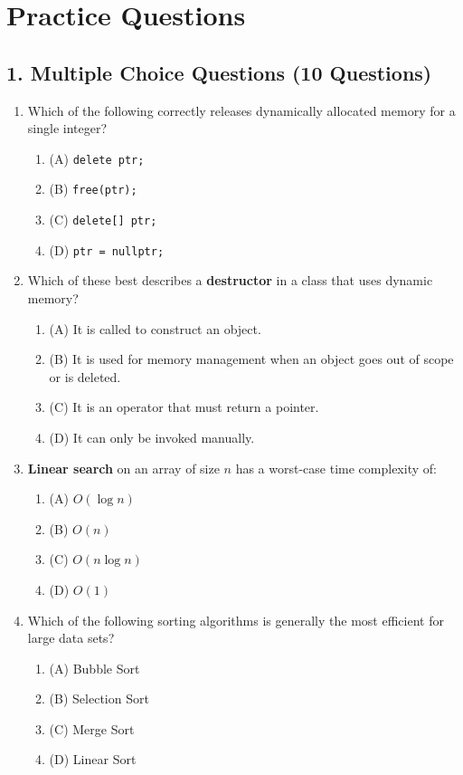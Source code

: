 \documentclass[a4paper,12pt]{article}
\begin{document}
\newpage
\section{Practice Questions}

\subsection{1. Multiple Choice Questions (10 Questions)}
\begin{enumerate}
    \item Which of the following correctly releases dynamically allocated memory for a single integer?
    \begin{enumerate}
        \item (A) \texttt{delete ptr;}
        \item (B) \texttt{free(ptr);}
        \item (C) \texttt{delete[] ptr;}
        \item (D) \texttt{ptr = nullptr;}
    \end{enumerate}

    \item Which of these best describes a \textbf{destructor} in a class that uses dynamic memory?
    \begin{enumerate}
        \item (A) It is called to construct an object.
        \item (B) It is used for memory management when an object goes out of scope or is deleted.
        \item (C) It is an operator that must return a pointer.
        \item (D) It can only be invoked manually.
    \end{enumerate}

    \item \textbf{Linear search} on an array of size $n$ has a worst-case time complexity of:
    \begin{enumerate}
        \item (A) $O(\log n)$
        \item (B) $O(n)$
        \item (C) $O(n \log n)$
        \item (D) $O(1)$
    \end{enumerate}

    \item Which of the following sorting algorithms is generally the most efficient for large data sets?
    \begin{enumerate}
        \item (A) Bubble Sort
        \item (B) Selection Sort
        \item (C) Merge Sort
        \item (D) Linear Sort
    \end{enumerate}


\end{enumerate}
\end{document}
